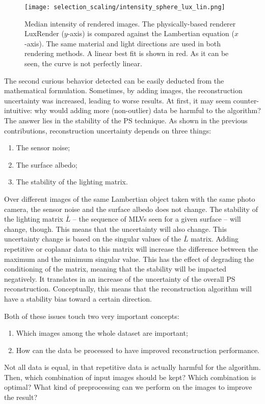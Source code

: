 \begin{figure}
\centering
\texttt{[image: selection\_scaling/intensity\_sphere\_lux\_lin.png]}
\caption{Median intensity of rendered images. The physically-based renderer LuxRender ($y$-axis) is compared against the Lambertian equation ($x$-axis). The same material and light directions are used in both rendering methods. A linear best fit is shown in red. As it can be seen, the curve is not perfectly linear.}
\label{fig:sel-scaling_error}
\end{figure}

The second curious behavior detected can be easily deducted from the mathematical formulation. Sometimes, by adding images, the reconstruction uncertainty was increased, leading to worse results. At first, it may seem counter-intuitive: why would adding more (non-outlier) data be harmful to the algorithm? The answer lies in the stability of the PS technique. As shown in the previous contributions, reconstruction uncertainty depends on three things:
\begin{enumerate}
  \item The sensor noise;
  \item The surface albedo;
  \item The stability of the lighting matrix.
\end{enumerate}
Over different images of the same Lambertian object taken with the same photo camera, the sensor noise and the surface albedo does not change. The stability of the lighting matrix $\bar{L}$ -- the sequence of MLVs seen for a given surface -- will change, though. This means that the uncertainty will also change. This uncertainty change is based on the singular values of the $\bar{L}$ matrix. Adding repetitive or coplanar data to this matrix will increase the difference between the maximum and the minimum singular value. This has the effect of degrading the conditioning of the matrix, meaning that the stability will be impacted negatively. It translates in an increase of the uncertainty of the overall PS reconstruction. Conceptually, this means that the reconstruction algorithm will have a stability bias toward a certain direction.

Both of these issues touch two very important concepts:
\begin{enumerate}
\item Which images among the whole
 dataset are important;
\item How can the data be processed to have improved reconstruction performance.
\end{enumerate}
Not all data is equal, in that repetitive data is actually harmful for the algorithm. Then, which combination of input images should be kept? Which combination is optimal? What kind of preprocessing can we perform on the images to improve the result?

